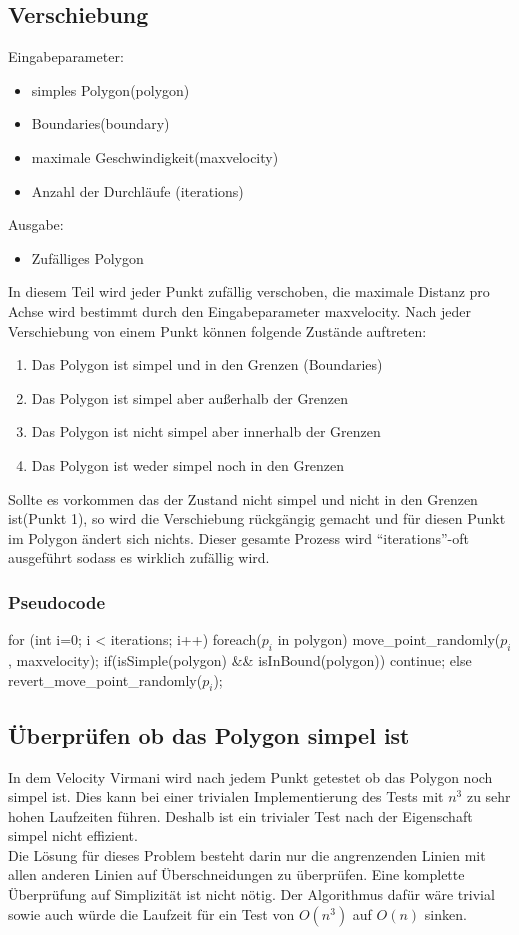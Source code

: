 \subsection{Verschiebung}
Eingabeparameter: 
\begin{itemize}
	\item simples Polygon(polygon)
	\item Boundaries(boundary)
	\item maximale Geschwindigkeit(maxvelocity)
	\item Anzahl der Durchläufe (iterations)
\end{itemize}
Ausgabe:
\begin{itemize}
	\item Zufälliges Polygon
\end{itemize}
In diesem Teil wird jeder Punkt zufällig verschoben, die maximale Distanz pro Achse wird bestimmt durch den Eingabeparameter maxvelocity. Nach jeder Verschiebung von einem Punkt können folgende Zustände auftreten:
\begin{enumerate}
	\item Das Polygon ist simpel und in den Grenzen (Boundaries)
	\item Das Polygon ist simpel aber außerhalb der Grenzen
	\item Das Polygon ist nicht simpel aber innerhalb der Grenzen
	\item Das Polygon ist weder simpel noch in den Grenzen
\end{enumerate}
Sollte es vorkommen das der Zustand nicht simpel und nicht in den Grenzen ist(Punkt 1), so wird die Verschiebung rückgängig gemacht und für diesen Punkt im Polygon ändert sich nichts.
Dieser gesamte Prozess wird \enquote{iterations}-oft ausgeführt sodass es wirklich zufällig wird.

\subsubsection{Pseudocode}

\begin{code}[mathescape=true]
for (int i=0; i < iterations; i++)
{
	foreach($p_i$ in polygon)
	{
		move_point_randomly($p_i$, maxvelocity);
		if(isSimple(polygon) && isInBound(polygon))
			continue;
		else
			revert_move_point_randomly($p_i$);
	}
}
\end{code}

\subsection{Überprüfen ob das Polygon simpel ist}
In dem Velocity Virmani wird nach jedem Punkt getestet ob das Polygon noch simpel ist. Dies kann bei einer trivialen Implementierung des Tests mit $n^3$ zu sehr hohen Laufzeiten führen.
Deshalb ist ein trivialer Test nach der Eigenschaft simpel nicht effizient.\smallskip \\ 
Die Lösung für dieses Problem besteht darin nur die angrenzenden Linien mit allen anderen Linien auf Überschneidungen zu überprüfen. Eine komplette Überprüfung auf Simplizität ist nicht nötig.
Der Algorithmus dafür wäre trivial sowie auch würde die Laufzeit für ein Test von $O(n^3)$ auf $O(n)$ sinken.

